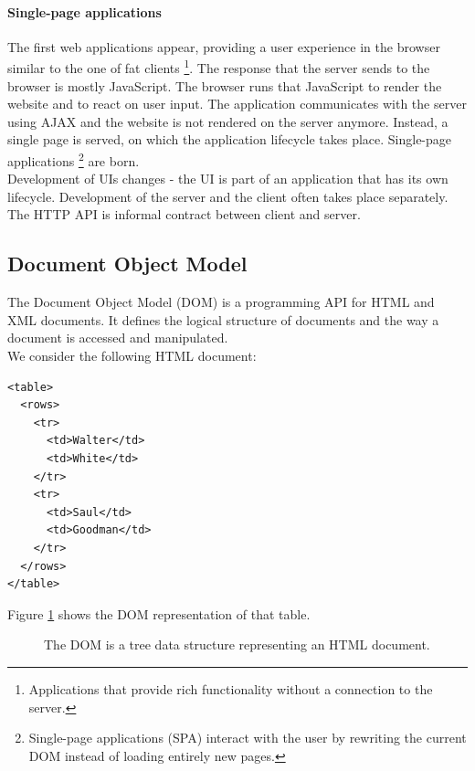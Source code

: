 \paragraph{Single-page applications} The first web applications appear, providing a user experience in the browser similar to the one of fat clients \footnote{Applications that provide rich functionality without a connection to the server.}. The response that the server sends to the browser is mostly JavaScript. The browser runs that JavaScript to render the website and to react on user input. The application communicates with the server using AJAX and the website is not rendered on the server anymore. Instead, a single page is served, on which the application lifecycle takes place. Single-page applications \footnote{Single-page applications (SPA) interact with the user by rewriting the current DOM instead of loading entirely new pages.} are born.
\\ Development of UIs changes - the UI is part of an application that has its own lifecycle. Development of the server and the client often takes place separately. The HTTP API is informal contract between client and server.

\subsection{Document Object Model}\label{documentobjectmodel}
The Document Object Model (DOM) is a programming API for HTML and XML documents. It defines the logical structure of documents and the way a document is accessed and manipulated. \citep{domintro} \\ We consider the following HTML document:

\lstset{language=XML}
\begin{lstlisting}[caption=HTML document of a table, label=htmloftable]
<table>
  <rows>
    <tr>
      <td>Walter</td>
      <td>White</td>
    </tr>
    <tr>
      <td>Saul</td>
      <td>Goodman</td>
    </tr>
  </rows>
</table>
\end{lstlisting}

Figure \ref{fig:dom} shows the DOM representation of that table.

\begin{figure}[!htb]
  \caption{The DOM is a tree data structure representing an HTML document.}
  \label{fig:dom}
\end{figure}

